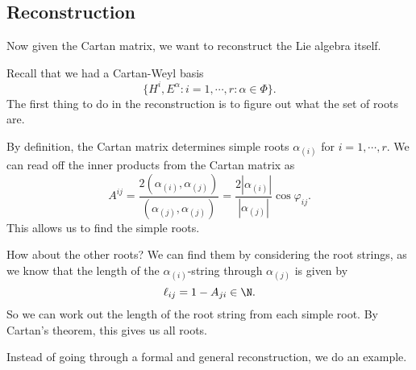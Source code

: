 \documentclass[a4paper]{article}
\begin{document}
\subsection{Reconstruction}
Now given the Cartan matrix, we want to reconstruct the Lie algebra itself.

Recall that we had a Cartan-Weyl basis
\[
  \{H^i, E^\alpha: i = 1, \cdots, r: \alpha \in \Phi\}.
\]
The first thing to do in the reconstruction is to figure out what the set of roots are.

By definition, the Cartan matrix determines simple roots $\alpha_{(i)}$ for $i = 1, \cdots, r$. We can read off the inner products from the Cartan matrix as
\[
  A^{ij} = \frac{2(\alpha_{(i)}, \alpha_{(j)})}{(\alpha_{(j)}, \alpha_{(j)})} = \frac{2|\alpha_{(i)}|}{|\alpha_{(j)}|} \cos \varphi_{ij}.
\]
This allows us to find the simple roots.

How about the other roots? We can find them by considering the root strings, as we know that the length of the $\alpha_{(i)}$-string through $\alpha_{(j)}$ is given by
\[
  \ell_{ij} = 1 - A_{ji} \in \N.
\]
So we can work out the length of the root string from each simple root. By Cartan's theorem, this gives us all roots.

Instead of going through a formal and general reconstruction, we do an example.
\end{document}
